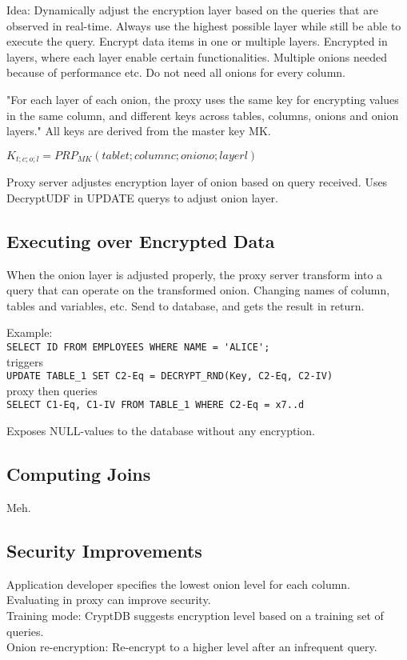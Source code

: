 \documentclass[10pt]{article}
\begin{document}
Idea: Dynamically adjust the encryption layer based on the queries that are observed in real-time. Always use the highest possible layer while still be able to execute the query. Encrypt data items in one or multiple layers. Encrypted in layers, where each layer enable certain functionalities. Multiple onions needed because of performance etc. Do not need all onions for every column.

"For each layer of each onion, the proxy uses the same key for encrypting values in the same column, and different keys across tables, columns, onions and onion layers." All keys are derived from the master key MK.

$K_{t;c;o;l} = PRP_{MK}(table t; column c; onion o; layer l)$

Proxy server adjustes encryption layer of onion based on query received. Uses DecryptUDF in UPDATE querys to adjust onion layer.


\subsection{Executing over Encrypted Data}

When the onion layer is adjusted properly, the proxy server transform into a query that can operate on the transformed onion. Changing names of column, tables and variables, etc. Send to database, and gets the result in return.

Example:\\
\verb!SELECT ID FROM EMPLOYEES WHERE NAME = 'ALICE';!\\
triggers\\
\verb!UPDATE TABLE_1 SET C2-Eq = DECRYPT_RND(Key, C2-Eq, C2-IV)!\\
proxy then queries\\
\verb!SELECT C1-Eq, C1-IV FROM TABLE_1 WHERE C2-Eq = x7..d!

Exposes NULL-values to the database without any encryption.

\subsection{Computing Joins}

Meh.

\subsection{Security Improvements}

Application developer specifies the lowest onion level for each column.\\
Evaluating in proxy can improve security.\\
Training mode: CryptDB suggests encryption level based on a training set of queries.\\
Onion re-encryption: Re-encrypt to a higher level after an infrequent query.\\
\end{document}
